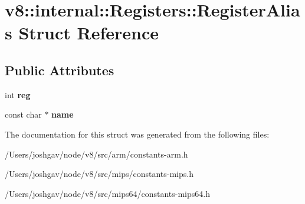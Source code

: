 \hypertarget{structv8_1_1internal_1_1_registers_1_1_register_alias}{}\section{v8\+:\+:internal\+:\+:Registers\+:\+:Register\+Alias Struct Reference}
\label{structv8_1_1internal_1_1_registers_1_1_register_alias}
\subsection*{Public Attributes}
\begin{DoxyCompactItemize}
\item 
int {\bfseries reg}\hypertarget{structv8_1_1internal_1_1_registers_1_1_register_alias_a8dc157b50ccc8a51abb1a30702240f40}{}\label{structv8_1_1internal_1_1_registers_1_1_register_alias_a8dc157b50ccc8a51abb1a30702240f40}

\item 
const char $\ast$ {\bfseries name}\hypertarget{structv8_1_1internal_1_1_registers_1_1_register_alias_abb530b1c04ec3c9043673000c46af11d}{}\label{structv8_1_1internal_1_1_registers_1_1_register_alias_abb530b1c04ec3c9043673000c46af11d}

\end{DoxyCompactItemize}


The documentation for this struct was generated from the following files\+:\begin{DoxyCompactItemize}
\item 
/\+Users/joshgav/node/v8/src/arm/constants-\/arm.\+h\item 
/\+Users/joshgav/node/v8/src/mips/constants-\/mips.\+h\item 
/\+Users/joshgav/node/v8/src/mips64/constants-\/mips64.\+h\end{DoxyCompactItemize}
